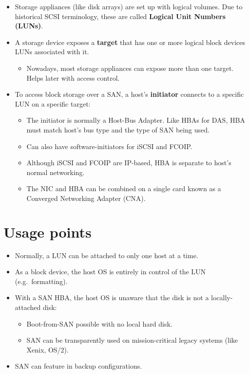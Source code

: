 \documentclass[slides]{pgnotes}
\begin{document}
\begin{itemize}
\item
  Storage appliances (like disk arrays) are set up with logical volumes.
  Due to historical SCSI terminology, these are called \textbf{Logical Unit Numbers (LUNs)}.
\item
  A storage device exposes a \textbf{target} that has one or more logical block devices LUNs associated with it.

  \begin{itemize}
  \item
    Nowadays, most storage appliances can expose more than one target.
    Helps later with access control.
  \end{itemize}
\item
  To access block storage over a SAN, a host's \textbf{initiator} connects to a specific LUN on a specific target:
  \begin{itemize}
  \item
    The initiator is normally a Host-Bus Adapter. Like HBAs for DAS, HBA
    must match host's bus type and the type of SAN being used.
  \item
    Can also have software-initiators for iSCSI and FCOIP.
  \item
    Although iSCSI and FCOIP are IP-based, HBA is separate to host's
    normal networking.
  \item
    The NIC and HBA can be combined on a single card known as a
    Converged Networking Adapter (CNA).
  \end{itemize}
\end{itemize}

\section{Usage points}
\label{sec:usage-points}

\begin{itemize}
\item
  Normally, a LUN can be attached to only one host at a time.
\item
  As a block device, the host OS is entirely in control of the LUN
  (e.g.~formatting).
\item
  With a SAN HBA, the host OS is unaware that the disk is not a
  locally-attached disk:

  \begin{itemize}
  \item
    Boot-from-SAN possible with no local hard disk.
  \item
    SAN can be transparently used on mission-critical legacy systems
    (like Xenix, OS/2).
  \end{itemize}
\item
  SAN can feature in backup configurations.
\end{itemize}
\end{document}
